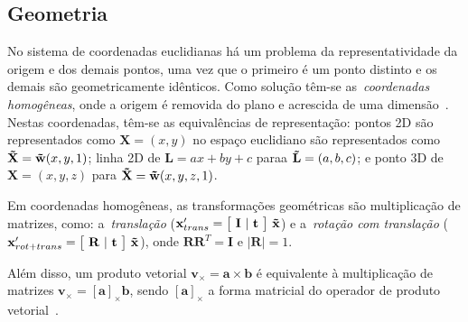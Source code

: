 \subsection{Geometria}
    \label{subsec:intro_geo}
No sistema de coordenadas euclidianas há um problema da representatividade da origem e dos demais pontos, uma vez que o primeiro é um ponto distinto e os demais são geometricamente idênticos. Como solução têm-se as~\emph{coordenadas homogêneas}, onde a origem é removida do plano e acrescida de uma dimensão~\cite{Li2001}. Nestas coordenadas, têm-se as equivalências de representação: pontos 2D são representados como $\mathbf{X} = (x, y)$ no espaço euclidiano são representados como $\mathbf{\Tilde{X}} = \mathbf{\Tilde{w}}(x, y, 1)$; linha 2D de $\mathbf{L} = ax + by + c$ paraa $\mathbf{\Tilde{L}} = (a, b, c)$; e ponto 3D de $\mathbf{X} = (x, y, z)$ para $\mathbf{\Tilde{X}} = \mathbf{\Tilde{w}}(x, y, z, 1)$.

Em coordenadas homogêneas, as transformações geométricas são multiplicação de matrizes, como: a~\emph{translação} ($\mathbf{x}'_{trans} = \big[ ~\mathbf{I}  ~|~ \mathbf{t}~ \big] ~ \mathbf{\Tilde{x}}$) e a~\emph{rotação com translação} ($\mathbf{x}'_{rot + trans} = \big[ ~\mathbf{R}  ~|~ \mathbf{t}~ \big] ~ \mathbf{\Tilde{x}}$), onde $\mathbf{R}\mathbf{R}^{T} = \mathbf{I}$ e $| \mathbf{R} | = 1$.

Além disso, um produto vetorial $\mathbf{v}_{\times} = \mathbf{a} \times \mathbf{b}$ é equivalente à multiplicação de matrizes $\mathbf{v}_{\times} = {[\mathbf{a}]}_{\times} \mathbf{b}$, sendo ${[\mathbf{a}]}_{\times}$ a forma matricial do operador de produto vetorial~\cite{Szeliski2012}.